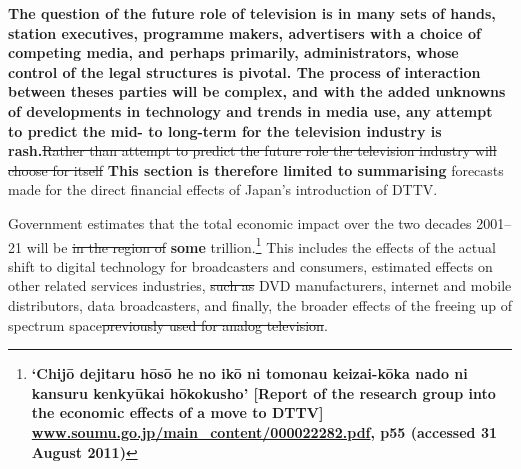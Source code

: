 \documentclass[11pt, oneside, a4paper, headsepline]{scrartcl}
\newcommand{\cjk}[1]{{\fontspec[Scale=0.9]{Hiragino Mincho Pro}#1}}
\newcommand{\ty}{\textyen}
\begin{document}
{\bf The question of the future role of television is in many sets of hands, station executives, programme makers, advertisers with a choice of competing media, and perhaps primarily, administrators, whose control of the legal structures is pivotal. The process of interaction between theses parties will be complex, and with the added unknowns of developments in technology and trends in media use, any attempt to predict the mid- to long-term for the television industry is rash.}\st{Rather than attempt to predict the future role the television industry will choose for itself} {\bf This section is therefore limited to summarising} forecasts made for the direct financial effects of Japan's introduction of DTTV. 

Government estimates that the total economic impact over the two decades 2001--21 will be \st{in the region of} \textbf{some} \ty249 trillion.\footnote{\bf `Chijō dejitaru hōsō he no ikō ni tomonau keizai-kōka nado ni kansuru kenkyūkai hōkokusho'  [Report of the research group into the economic effects of a move to DTTV] \url{www.soumu.go.jp/main_content/000022282.pdf}, p55 (accessed 31 August 2011)} This includes the effects of the actual shift to digital technology for broadcasters and consumers, estimated effects on other related services industries, \st{such as }DVD manufacturers, internet and mobile distributors, data broadcasters, and finally, the broader effects of the freeing up of spectrum space\st{previously used for analog television}.

\end{document}
